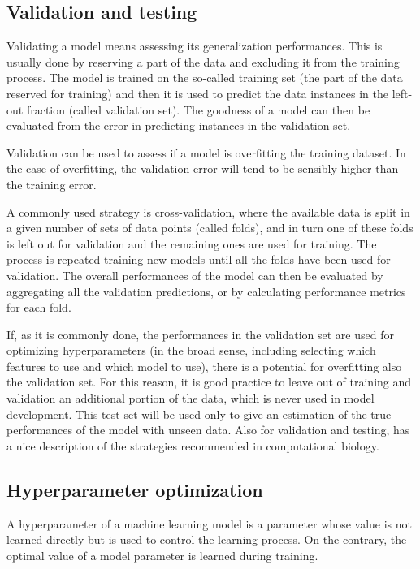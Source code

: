 \subsection{Validation and testing}
Validating a model means assessing its generalization performances.
This is usually done by reserving a part of the data and excluding it from the training process.
The model is trained on the so-called training set (the part of the data reserved for training) and then it is used to predict the data instances in the left-out fraction (called validation set).
The goodness of a model can then be evaluated from the error in predicting instances in the validation set.

Validation can be used to assess if a model is overfitting the training dataset.
In the case of overfitting, the validation error will tend to be sensibly higher than the training error.

A commonly used strategy is cross-validation, where the available data is split in a given number of sets of data points (called folds), and in turn one of these folds is left out for validation and the remaining ones are used for training.
The process is repeated training new models until all the folds have been used for validation.
The overall performances of the model can then be evaluated by aggregating all the validation predictions, or by calculating performance metrics for each fold.

If, as it is commonly done, the performances in the validation set are used for optimizing hyperparameters (in the broad sense, including selecting which features to use and which model to use), there is a potential for overfitting also the validation set.
For this reason, it is good practice to leave out of training and validation an additional portion of the data, which is never used in model development.
This test set will be used only to give an estimation of the true performances of the model with unseen data.
Also for validation and testing, \textcite{Chicco2017} has a nice description of the strategies recommended in computational biology.

\subsection{Hyperparameter optimization}
A hyperparameter of a machine learning model is a parameter whose value is not learned directly but is used to control the learning process.
On the contrary, the optimal value of a model parameter is learned during training.

